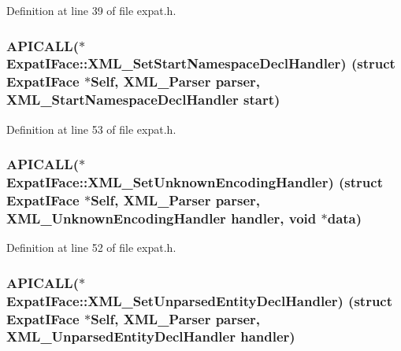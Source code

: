 Definition at line 39 of file expat.\+h.

\subsubsection[{\texorpdfstring{X\+M\+L\+\_\+\+Set\+Start\+Namespace\+Decl\+Handler}{XML_SetStartNamespaceDeclHandler}}]{ A\+P\+I\+C\+A\+LL($\ast$ Expat\+I\+Face\+::\+X\+M\+L\+\_\+\+Set\+Start\+Namespace\+Decl\+Handler) (struct {\bf Expat\+I\+Face} $\ast$Self, {\bf X\+M\+L\+\_\+\+Parser} parser, {\bf X\+M\+L\+\_\+\+Start\+Namespace\+Decl\+Handler} {\bf start})}\hypertarget{struct_expat_i_face_a9f1ffd741500a40b33b02b9458bce0b1}{}\label{struct_expat_i_face_a9f1ffd741500a40b33b02b9458bce0b1}


Definition at line 53 of file expat.\+h.

\subsubsection[{\texorpdfstring{X\+M\+L\+\_\+\+Set\+Unknown\+Encoding\+Handler}{XML_SetUnknownEncodingHandler}}]{ A\+P\+I\+C\+A\+LL($\ast$ Expat\+I\+Face\+::\+X\+M\+L\+\_\+\+Set\+Unknown\+Encoding\+Handler) (struct {\bf Expat\+I\+Face} $\ast$Self, {\bf X\+M\+L\+\_\+\+Parser} parser, {\bf X\+M\+L\+\_\+\+Unknown\+Encoding\+Handler} handler, {\bf void} $\ast${\bf data})}\hypertarget{struct_expat_i_face_a1a39f3f0951cdb848581c4a4cd63bab9}{}\label{struct_expat_i_face_a1a39f3f0951cdb848581c4a4cd63bab9}


Definition at line 52 of file expat.\+h.

\subsubsection[{\texorpdfstring{X\+M\+L\+\_\+\+Set\+Unparsed\+Entity\+Decl\+Handler}{XML_SetUnparsedEntityDeclHandler}}]{ A\+P\+I\+C\+A\+LL($\ast$ Expat\+I\+Face\+::\+X\+M\+L\+\_\+\+Set\+Unparsed\+Entity\+Decl\+Handler) (struct {\bf Expat\+I\+Face} $\ast$Self, {\bf X\+M\+L\+\_\+\+Parser} parser, {\bf X\+M\+L\+\_\+\+Unparsed\+Entity\+Decl\+Handler} handler)}\hypertarget{struct_expat_i_face_a7f88a4fa4af98d52c56ef9f1fd6c4df6}{}\label{struct_expat_i_face_a7f88a4fa4af98d52c56ef9f1fd6c4df6}


